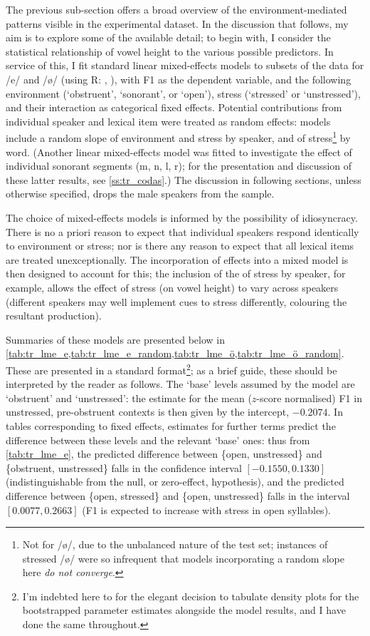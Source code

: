 The previous sub-section offers a broad overview of the environment-mediated patterns visible in the experimental dataset. In the discussion that follows, my aim is to explore some of the available detail; to begin with, I consider the statistical relationship of vowel height to the various possible predictors. In service of this, I fit standard linear mixed-effects models to subsets of the data for /e/ and /\o/ (using R: , \citealt{lme4}), with F1 as the dependent variable, and the following environment (`obstruent', `sonorant', or `open'), stress (`stressed' or `unstressed'), and their interaction as categorical fixed effects. Potential contributions from individual speaker and lexical item were treated as random effects: models include a random slope of environment and stress by speaker, and of stress\footnote{Not for /ø/, due to the unbalanced nature of the test set; instances of stressed /ø/ were so infrequent that models incorporating a random slope here \emph{do not converge}.} by word. (Another linear mixed-effects model was fitted to investigate the effect of individual sonorant segments (m, n, l, r); for the presentation and discussion of these latter results, see \cref{ss:tr_codas}.) The discussion in following sections, unless otherwise specified, drops the male speakers from the sample.

The choice of mixed-effects models is informed by the possibility of idiosyncracy. There is no a priori reason to expect that individual speakers respond identically to environment or stress; nor is there any reason to expect that all lexical items are treated unexceptionally. The incorporation of  effects into a mixed model is then designed to account for this; the inclusion of the  of stress by speaker, for example, allows the effect of stress (on vowel height) to vary across speakers (different speakers may well implement cues to stress differently, colouring the resultant production).

Summaries of these models are presented below in \cref{tab:tr_lme_e,tab:tr_lme_e_random,tab:tr_lme_ö,tab:tr_lme_ö_random}. These are presented in a standard format\footnote{I'm indebted here to \cite{Fruehwald2016} for the elegant decision to tabulate density plots for the bootstrapped parameter estimates alongside the model results, and I have done the same throughout.}; as a brief guide, these should be interpreted by the reader as follows. The `base' levels assumed by the model are `obstruent' and `unstressed': the estimate for the mean ($z$-score normalised) F1 in unstressed, pre-obstruent contexts is then given by the intercept, $-0.2074$. In tables corresponding to fixed effects, estimates for further terms predict the difference between these levels and the relevant `base' ones: thus from \cref{tab:tr_lme_e}, the predicted difference between \{open, unstressed\} and \{obstruent, unstressed\} falls in the confidence interval $[-0.1550, 0.1330]$ (indistinguishable from the null, or zero-effect, hypothesis), and the predicted difference between \{open, stressed\} and \{open, unstressed\} falls in the interval $[0.0077, 0.2663]$ (F1 is expected to increase with stress in open syllables).

